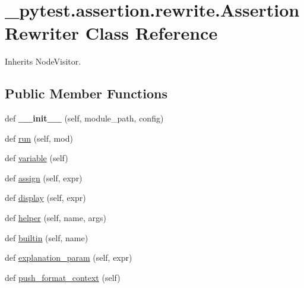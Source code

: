 \hypertarget{class__pytest_1_1assertion_1_1rewrite_1_1_assertion_rewriter}{}\section{\+\_\+pytest.\+assertion.\+rewrite.\+Assertion\+Rewriter Class Reference}
\label{class__pytest_1_1assertion_1_1rewrite_1_1_assertion_rewriter}


Inherits Node\+Visitor.

\subsection*{Public Member Functions}
\begin{DoxyCompactItemize}
\item 
\mbox{\label{class__pytest_1_1assertion_1_1rewrite_1_1_assertion_rewriter_af00df4e9525f9c2ccf2c842a514fe8ef}} 
def {\bfseries \+\_\+\+\_\+init\+\_\+\+\_\+} (self, module\+\_\+path, config)
\item 
def \hyperlink{class__pytest_1_1assertion_1_1rewrite_1_1_assertion_rewriter_ae3af02a0f2a2a4dc3812d0c9736b0958}{run} (self, mod)
\item 
def \hyperlink{class__pytest_1_1assertion_1_1rewrite_1_1_assertion_rewriter_a3b2edef663dfd4b70f608c876ff06cd1}{variable} (self)
\item 
def \hyperlink{class__pytest_1_1assertion_1_1rewrite_1_1_assertion_rewriter_a32a752e2c6a3748a2c701a460f671d8b}{assign} (self, expr)
\item 
def \hyperlink{class__pytest_1_1assertion_1_1rewrite_1_1_assertion_rewriter_a115cbcd335312fac5f39d14e768e9b71}{display} (self, expr)
\item 
def \hyperlink{class__pytest_1_1assertion_1_1rewrite_1_1_assertion_rewriter_abfe3e9f58002edf47120a8f222152b89}{helper} (self, name, args)
\item 
def \hyperlink{class__pytest_1_1assertion_1_1rewrite_1_1_assertion_rewriter_aaf1c368a66668ade9977460b52cf41e2}{builtin} (self, name)
\item 
def \hyperlink{class__pytest_1_1assertion_1_1rewrite_1_1_assertion_rewriter_abe59ee2dd8de8ed7c02ca4aa40a7e4cd}{explanation\+\_\+param} (self, expr)
\item 
def \hyperlink{class__pytest_1_1assertion_1_1rewrite_1_1_assertion_rewriter_a590937da24b0c7344679f33cad4ac77f}{push\+\_\+format\+\_\+context} (self)

\end{DoxyCompactItemize}
